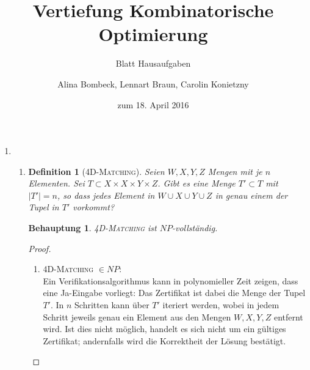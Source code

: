 \documentclass[a4paper]{scrartcl}
\title{Vertiefung Kombinatorische Optimierung}
\subtitle{Blatt {\blattnr} Hausaufgaben}
\author{%
    Alina Bombeck,
    Lennart Braun,
    Carolin Konietzny
}
\date{zum 18. April 2016}
\newtheorem*{proposition}{Behauptung}
\newtheorem*{definition}{Definition}
\begin{document}
\maketitle


\begin{enumerate}[label=\bfseries \arabic*.]
\item %
\begin{enumerate}
\item
    \begin{definition}[\textsc{4D-Matching}]
        Seien $W,X,Y,Z$ Mengen mit je $n$ Elementen.
        Sei $T \subset X \times X \times Y \times Z$.
        Gibt es eine Menge $T' \subset T$ mit $|T'| = n$, so dass jedes Element
        in $W \cup X \cup Y \cup Z$ in genau einem der Tupel in $T'$ vorkommt?
    \end{definition}
    \begin{proposition}
        \textsc{4D-Matching} ist $NP$-vollständig.
    \end{proposition}
    \begin{proof}
        \hfill \\
        \begin{enumerate}
            \item \textsc{4D-Matching} $\in NP$: \\
                Ein Verifikationsalgorithmus kann in polynomieller Zeit zeigen,
                dass eine Ja-Eingabe vorliegt: Das Zertifikat ist dabei die
                Menge der Tupel $T'$. In $n$ Schritten kann über $T'$ iteriert
                werden, wobei in jedem Schritt jeweils genau ein Element aus
                den Mengen $W,X,Y,Z$ entfernt wird. Ist dies nicht möglich,
                handelt es sich nicht um ein gültiges Zertifikat; andernfalls
                wird die Korrektheit der Lösung bestätigt.


\end{enumerate}
\end{proof}
\end{enumerate}
\end{enumerate}
\end{document}

